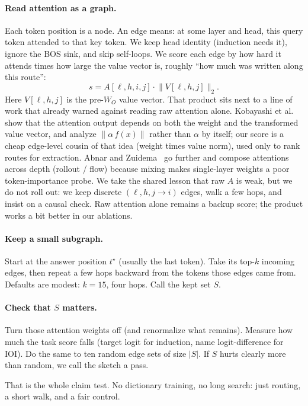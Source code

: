 \documentclass[11pt]{article}
\begin{document}
\paragraph{Read attention as a graph.}
Each token position is a node. An edge means: at some layer and head, this
query token attended to that key token. We keep head identity (induction needs
it), ignore the BOS sink, and skip self-loops. We score each edge by how hard
it attends times how large the value vector is, roughly ``how much was
written along this route'':
\[
s = A[\ell,h,i,j] \cdot \bigl\|V[\ell,h,j]\bigr\|_2 .
\]
Here \(V[\ell,h,j]\) is the pre-\(W_O\) value vector. That product sits next to a line of work that already warned against reading
raw attention alone. Kobayashi et al.~\cite{kobayashi2020attn} show that the
attention output depends on both the weight and the transformed value vector,
and analyze \(\|\alpha\,f(x)\|\) rather than \(\alpha\) by itself; our score is
a cheap edge-level cousin of that idea (weight times value norm), used only to
rank routes for extraction. Abnar and Zuidema~\cite{abnar2020rollout} go
further and compose attentions across depth (rollout / flow) because mixing
makes single-layer weights a poor token-importance probe. We take the shared
lesson that raw \(A\) is weak, but we do not roll out: we keep discrete
\((\ell,h,j\!\to\!i)\) edges, walk a few hops, and insist on a causal check.
Raw attention alone remains a backup score; the product works a bit better in
our ablations.

\paragraph{Keep a small subgraph.}
Start at the answer position \(t^\star\) (usually the last token). Take its
top-\(k\) incoming edges, then repeat a few hops backward from the tokens those
edges came from. Defaults are modest: \(k{=}15\), four hops. Call the kept set
\(S\).

\paragraph{Check that \(S\) matters.}
Turn those attention weights off (and renormalize what remains). Measure how
much the task score falls (target logit for induction, name logit-difference
for IOI). Do the same to ten random edge sets of size \(|S|\).
If \(S\) hurts clearly more than random, we call the sketch a pass.

That is the whole claim test. No dictionary training, no long search: just
routing, a short walk, and a fair control.
\end{document}
